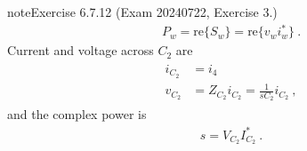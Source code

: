 \documentclass[letterpaper,10pt,english]{jupyterBook}
\begin{document}
\begin{sphinxadmonition}{note}{Exercise 6.7.12 (Exam 2024\sphinxhyphen{}07\sphinxhyphen{}22, Exercise 3.)}
\begin{equation*}
\begin{split}P_w = \text{re} \{ S_w \} = \text{re} \{ v_w i_w^* \} \ .\end{split}
\end{equation*}
\sphinxAtStartPar
{} Current and voltage across \(C_2\) are
\begin{equation*}
\begin{split}\begin{aligned}
  i_{C_2} & = i_4 \\
  v_{C_2} & = Z_{C_2} i_{C_2} = \frac{1}{s C_2} i_{C_2} \ ,
\end{aligned}\end{split}
\end{equation*}
\sphinxAtStartPar
and the complex power is
\begin{equation*}
\begin{split}s = V_{C_2} I_{C_2}^* \ .\end{split}
\end{equation*}\end{sphinxadmonition}
 \label{exercise:exam-24-06-19-exe-01}
\end{document}
